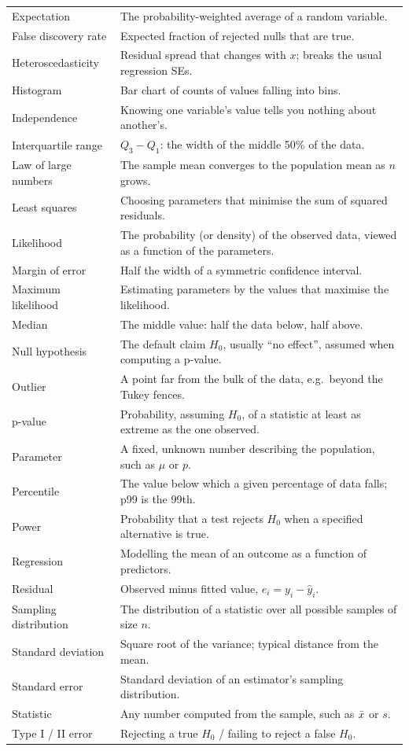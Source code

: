\begin{longtable}{@{}p{3.6cm}p{11.2cm}@{}}
Expectation & The probability-weighted average of a random variable. \\
False discovery rate & Expected fraction of rejected nulls that are true. \\
Heteroscedasticity & Residual spread that changes with $x$; breaks the usual regression SEs. \\
Histogram & Bar chart of counts of values falling into bins. \\
Independence & Knowing one variable's value tells you nothing about another's. \\
Interquartile range & $Q_3-Q_1$: the width of the middle 50\% of the data. \\
Law of large numbers & The sample mean converges to the population mean as $n$ grows. \\
Least squares & Choosing parameters that minimise the sum of squared residuals. \\
Likelihood & The probability (or density) of the observed data, viewed as a function of the parameters. \\
Margin of error & Half the width of a symmetric confidence interval. \\
Maximum likelihood & Estimating parameters by the values that maximise the likelihood. \\
Median & The middle value: half the data below, half above. \\
Null hypothesis & The default claim $H_0$, usually ``no effect'', assumed when computing a p-value. \\
Outlier & A point far from the bulk of the data, e.g.\ beyond the Tukey fences. \\
p-value & Probability, assuming $H_0$, of a statistic at least as extreme as the one observed. \\
Parameter & A fixed, unknown number describing the population, such as $\mu$ or $p$. \\
Percentile & The value below which a given percentage of data falls; p99 is the 99th. \\
Power & Probability that a test rejects $H_0$ when a specified alternative is true. \\
Regression & Modelling the mean of an outcome as a function of predictors. \\
Residual & Observed minus fitted value, $e_i=y_i-\hat y_i$. \\
Sampling distribution & The distribution of a statistic over all possible samples of size $n$. \\
Standard deviation & Square root of the variance; typical distance from the mean. \\
Standard error & Standard deviation of an estimator's sampling distribution. \\
Statistic & Any number computed from the sample, such as $\bar{x}$ or $s$. \\
Type I / II error & Rejecting a true $H_0$ / failing to reject a false $H_0$. \\
\bottomrule
\end{longtable}
\normalsize
